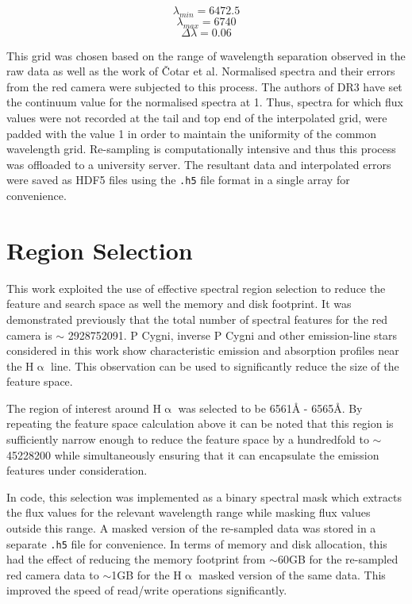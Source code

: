 \[\lambda_{min} = 6472.5\]
\[\lambda_{max} = 6740\]
\[\Delta\lambda = 0.06\]

This grid was chosen based on the range of wavelength separation observed in the raw data as well as the work of Čotar et al. Normalised spectra and their errors from the red camera were subjected to this process. The authors of DR3 have set the continuum value for the normalised spectra at 1. Thus, spectra for which flux values were not recorded at the tail and top end of the interpolated grid, were padded with the value 1 in order to maintain the uniformity of the common wavelength grid. Re-sampling is computationally intensive and thus this process was offloaded to a university server. The resultant data and interpolated errors were saved as HDF5 files using the \texttt{.h5} file format in a single array for convenience. 

\section{Region Selection}

This work exploited the use of effective spectral region selection to reduce the feature and search space as well the memory and disk footprint. It was demonstrated previously that the total number of spectral features for the red camera is $\sim$ \num[round-precision=2,round-mode=figures, scientific-notation=true]{2928752091}. P Cygni, inverse P Cygni and other emission-line stars considered in this work show characteristic emission and absorption profiles near the H$\upalpha$ line. This observation can be used to significantly reduce the size of the feature space. 

The region of interest around H$\upalpha$ was selected to be 6561\r{A} - 6565\r{A}\cite{traven2017galah}. By repeating the feature space calculation above it can be noted that this region is sufficiently narrow enough to reduce the feature space by a hundredfold to $\sim$ \num[round-precision=2,round-mode=figures, scientific-notation=true]{45228200} while simultaneously ensuring that it can encapsulate the emission features under consideration. 

In code, this selection was implemented as a binary spectral mask which extracts the flux values for the relevant wavelength range while masking flux values outside this range. A masked version of the re-sampled data was stored in a separate \texttt{.h5} file for convenience. In terms of memory and disk allocation, this had the effect of reducing the memory footprint from $\sim$60GB for the re-sampled red camera data to $\sim$1GB for the H$\upalpha$ masked version of the same data. This improved the speed of read/write operations significantly. 

